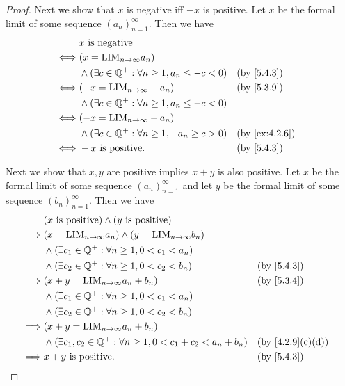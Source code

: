 \begin{proof}
  Next we show that \(x\) is negative iff \(-x\) is positive.
  Let \(x\) be the formal limit of some sequence \((a_n)_{n = 1}^{\infty}\).
  Then we have
  \begin{align*}
         & x \text{ is negative}                                                             \\
    \iff & (x = \text{LIM}_{n \to \infty} a_n)                                               \\
         & \land (\exists c \in \Q^+ : \forall n \geq 1, a_n \leq -c < 0) &  & \by{5.4.3}    \\
    \iff & (-x = \text{LIM}_{n \to \infty} -a_n)                          &  & \by{5.3.9}    \\
         & \land (\exists c \in \Q^+ : \forall n \geq 1, a_n \leq -c < 0)                    \\
    \iff & (-x = \text{LIM}_{n \to \infty} -a_n)                                             \\
         & \land (\exists c \in \Q^+ : \forall n \geq 1, -a_n \geq c > 0) &  & \by{ex:4.2.6} \\
    \iff & -x \text{ is positive}.                                        &  & \by{5.4.3}
  \end{align*}

  Next we show that \(x, y\) are positive implies \(x + y\) is also positive.
  Let \(x\) be the formal limit of some sequence \((a_n)_{n = 1}^{\infty}\) and let \(y\) be the formal limit of some sequence \((b_n)_{n = 1}^{\infty}\).
  Then we have
  \begin{align*}
             & (x \text{ is positive}) \land (y \text{ is positive})                                                \\
    \implies & (x = \text{LIM}_{n \to \infty} a_n) \land (y = \text{LIM}_{n \to \infty} b_n)                        \\
             & \land (\exists c_1 \in \Q^+ : \forall n \geq 1, 0 < c_1 < a_n)                                       \\
             & \land (\exists c_2 \in \Q^+ : \forall n \geq 1, 0 < c_2 < b_n)                  &  & \by{5.4.3}      \\
    \implies & (x + y = \text{LIM}_{n \to \infty} a_n + b_n)                                   &  & \by{5.3.4}      \\
             & \land (\exists c_1 \in \Q^+ : \forall n \geq 1, 0 < c_1 < a_n)                                       \\
             & \land (\exists c_2 \in \Q^+ : \forall n \geq 1, 0 < c_2 < b_n)                                       \\
    \implies & (x + y = \text{LIM}_{n \to \infty} a_n + b_n)                                                        \\
             & \land (\exists c_1, c_2 \in \Q^+ : \forall n \geq 1, 0 < c_1 + c_2 < a_n + b_n) &  & \by{4.2.9}[c,d] \\
    \implies & x + y \text{ is positive}.                                                      &  & \by{5.4.3}
  \end{align*}


\end{proof}
